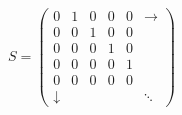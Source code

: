 \begin{equation}
S= \left(
\begin{array}{cccccc}
0 & 1 & 0 & 0 & 0 & \rightarrow \\
0 & 0 & 1 & 0 & 0 &  \\
0 & 0 & 0 & 1 & 0 &  \\
0 & 0 & 0 & 0 & 1 &  \\
0 & 0 & 0 & 0 & 0 &  \\
\downarrow &  &  &  &  & \ddots
\end{array}
\right)
\end{equation}

